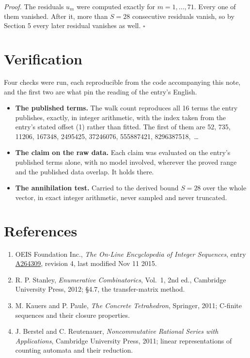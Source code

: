 \documentclass[11pt]{article}
\theoremstyle{definition}
\begin{document}
{\itshape Proof.} The residuals $u_m$ were computed exactly for $m = 1,\dots,71$. Every one of them vanished. After it, more than $S = 28$ consecutive residuals vanish, so by Section 5 every later residual vanishes as well. $\square$

\section{Verification}

Four checks were run, each reproducible from the code accompanying this note, and the first two are what pin the reading of the entry's English.

\begin{itemize}

\item {\bfseries The published terms.} The walk count reproduces all 16 terms the entry publishes, exactly, in integer arithmetic, with the index taken from the entry's stated offset (1) rather than fitted. The first of them are 52, 735, 11206, 167348, 2495425, 37246076, 555887421, 8296387518,~\dots

\item {\bfseries The claim on the raw data.} Each claim was evaluated on the entry's published terms alone, with no model involved, wherever the proved range and the published data overlap. It holds there.

\item {\bfseries The annihilation test.} Carried to the derived bound $S = 28$ over the whole vector, in exact integer arithmetic, never sampled and never truncated.

\end{itemize}

\section{References}

\begin{enumerate}

\item OEIS Foundation Inc., \emph{The On-Line Encyclopedia of Integer Sequences}, entry \href{https://oeis.org/A264309}{A264309}, revision 4, last modified Nov 11 2015.

\item R. P. Stanley, \emph{Enumerative Combinatorics}, Vol.~1, 2nd ed., Cambridge University Press, 2012; \S4.7, the transfer-matrix method.

\item M. Kauers and P. Paule, \emph{The Concrete Tetrahedron}, Springer, 2011; C-finite sequences and their closure properties.

\item J. Berstel and C. Reutenauer, \emph{Noncommutative Rational Series with Applications}, Cambridge University Press, 2011; linear representations of counting automata and their reduction.

\end{enumerate}
\end{document}
